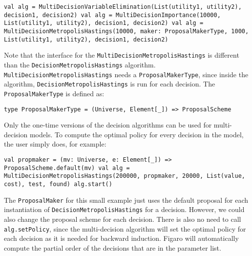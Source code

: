 \begin{flushleft}
\texttt{val alg = MultiDecisionVariableElimination(List(utility1, utility2), decision1, decision2)
\newline val alg = MultiDecisionImportance(10000,	List(utility1, utility2), decision1, decision2)
\newline val alg = MultiDecisionMetropolisHastings(10000, maker: ProposalMakerType, 1000, List(utility1, utility2), decision1, decision2)
}
\end{flushleft}

Note that the interface for the \texttt{MultiDecisionMetropolisHastings} is different than the \texttt{DecisionMetropolisHastings} algorithm. \texttt{MultiDec\-isionMetropolisHastings} needs a \texttt{ProposalMakerType}, since inside the algorithm, \texttt{Decision\-MetropolisHastings} is run for each decision. The \texttt{ProposalMakerType} is defined as:

\begin{flushleft}
\texttt{type ProposalMakerType = (Universe, Element[\_]) => ProposalScheme}
\end{flushleft}

Only the one-time versions of the decision algorithms can be used for multi-decision models. To compute the optimal policy for every decision in the model, the user simply does, for example:

\begin{flushleft}
\texttt{val propmaker = (mv: Universe, e: Element[\_]) => ProposalScheme.default(mv)
\newline val alg = MultiDecisionMetropolisHastings(200000, propmaker, 20000, List(value, cost), test, found)
\newline alg.start()}
\end{flushleft}

The \texttt{ProposalMaker} for this small example just uses the default proposal for each instantiation of \texttt{DecisionMetropolisHastings} for a decision. However, we could also change the proposal scheme for each decision. There is also no need to call \texttt{alg.setPolicy}, since the multi-decision algorithm will set the optimal policy for each decision as it is needed for backward induction. Figaro will automatically compute the partial order of the decisions that are in the parameter list.
